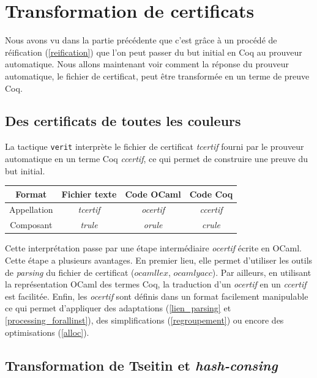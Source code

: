 \documentclass[11pt]{article}
\begin{document}
\section{Transformation de certificats} \label{transformation_certif}

Nous avons vu dans la partie précédente que c'est grâce à un procédé de réification (\ref{reification}) que l'on peut passer du but initial en Coq au prouveur automatique. Nous allons maintenant voir comment la réponse du prouveur automatique, le fichier de certificat, peut être transformée en un terme de preuve Coq.

\subsection{Des certificats de toutes les couleurs} \label{des_certificats}

La tactique \texttt{verit} interprète le fichier de certificat \textit{tcertif} fourni par le prouveur automatique en un terme Coq \textit{ccertif}, ce qui permet de construire une preuve du but initial. 

\begin{center}
\begin{tabular}{ |c||c|c|c| } 
 \hline
 Format & Fichier texte & Code OCaml & Code Coq \\ 
 \hline
 Appellation & \textit{tcertif} & \textit{ocertif} & \textit{ccertif} \\ 
 \hline
 Composant & \textit{trule} & \textit{orule} & \textit{crule} \\ 
 \hline
\end{tabular}
\end{center}

Cette interprétation passe par une étape intermédiaire \textit{ocertif} écrite en OCaml. Cette étape a plusieurs avantages. En premier lieu, elle permet d'utiliser les outils de \textit{parsing} du fichier de certificat ($ocamllex$, $ocamlyacc$). Par ailleurs, en utilisant la représentation OCaml des termes Coq, la traduction d'un \textit{ocertif} en un \textit{ccertif} est facilitée. Enfin, les \textit{ocertif} sont définis dans un format facilement manipulable ce qui permet d'appliquer des adaptations (\ref{lien_parsing} et \ref{processing_forallinst}), des simplifications (\ref{regroupement}) ou encore des optimisations (\ref{alloc}).

\subsection{Transformation de Tseitin et \textit{hash-consing}} \label{tseitin}
\end{document}
